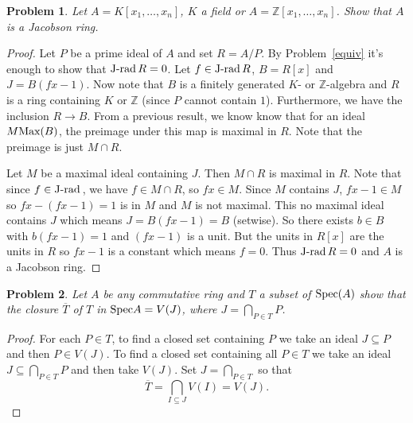 \documentclass{article}
\newcommand{\spec}{\textup{Spec}}
\newcommand{\J}{\textup{J-rad}\,}
\newcommand{\Max}{\textup{Max}}
\newtheorem{problem}{Problem}
\begin{document}
\begin{problem}
Let $A = K[x_1, \dots , x_n]$, $K$ a field or $A = \mathbb{Z}[x_1, \dots , x_n]$. Show that $A$ is a Jacobson ring.
\end{problem}
\begin{proof}
Let $P$ be a prime ideal of $A$ and set $R = A/P$. By Problem~\ref{equiv} it's enough to show that $\J R = 0$. Let $f \in \J R$, $B = R[x]$ and $J = B(fx - 1)$. Now note that $B$ is a finitely generated $K$- or $\mathbb{Z}$-algebra and $R$ is a ring containing $K$ or $\mathbb{Z}$ (since $P$ cannot contain $1$). Furthermore, we have the inclusion $R \to B$. From a previous result, we know know that for an ideal $M \Max(B)$, the preimage under this map is maximal in $R$. Note that the preimage is just $M \cap R$.

Let $M$ be a maximal ideal containing $J$. Then $M \cap R$ is maximal in $R$. Note that since $f \in \J$, we have $f \in M \cap R$, so $fx \in M$. Since $M$ contains $J$, $fx-1 \in M$ so $fx - (fx - 1) = 1$ is in $M$ and $M$ is not maximal. This no maximal ideal contains $J$ which means $J = B(fx - 1) = B$ (setwise). So there exists $b \in B$ with $b(fx-1) = 1$ and $(fx-1)$ is a unit. But the units in $R[x]$ are the units in $R$ so $fx-1$ is a constant which means $f = 0$. Thus $\J R = 0$ and $A$ is a Jacobson ring.
\end{proof}

\begin{problem}
\label{closure}
Let $A$ be any commutative ring and $T$ a subset of $\spec(A)$ show that the closure $\overline{T}$ of $T$ in $\spec A = V(J)$, where $J = \bigcap_{P \in T} P$.
\end{problem}
\begin{proof}
For each $P \in T$, to find a closed set containing $P$ we take an ideal $J \subseteq P$ and then $P \in V(J)$. To find a closed set containing all $P \in T$ we take an ideal $J \subseteq \bigcap_{P \in T} P$ and then take $V(J)$. Set $J = \bigcap_{P \in T}$ so that
\[
\overline{T} = \bigcap_{I \subseteq J} V(I) = V(J).
\]
\end{proof}
\end{document}

